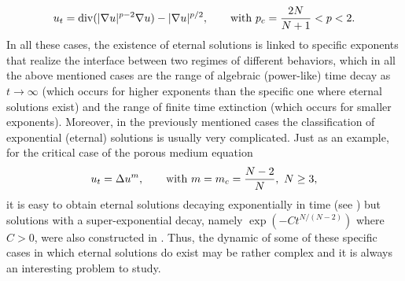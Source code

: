 \documentclass[a4paper,11pt]{article}
\numberwithin{equation}{section}
\begin{document}
$$
u_t={\rm div}(|\nabla u|^{p-2}\nabla u)-|\nabla u|^{p/2}, \qquad {\rm with} \ p_c=\frac{2N}{N+1}<p<2.
$$
In all these cases, the existence of eternal solutions is linked to specific exponents that realize the interface between two regimes of different behaviors, which in all the above mentioned cases are the range of algebraic (power-like) time decay as $t\to\infty$ (which occurs for higher exponents than the specific one where eternal solutions exist) and the range of finite time extinction (which occurs for smaller exponents). Moreover, in the previously mentioned cases the classification of exponential (eternal) solutions is usually very complicated. Just as an example, for the critical case of the porous medium equation
$$
u_t=\Delta u^m, \qquad {\rm with} \ m=m_c=\frac{N-2}{N}, \ N\geq3,
$$
it is easy to obtain eternal solutions decaying exponentially in time (see \cite[Section 5.6.1]{VazSm}) but solutions with a super-exponential decay, namely $\exp(-Ct^{N/(N-2)})$ where $C>0$, were also constructed in \cite{GPV00}. Thus, the dynamic of some of these specific cases in which eternal solutions do exist may be rather complex and it is always an interesting problem to study.
\end{document}
